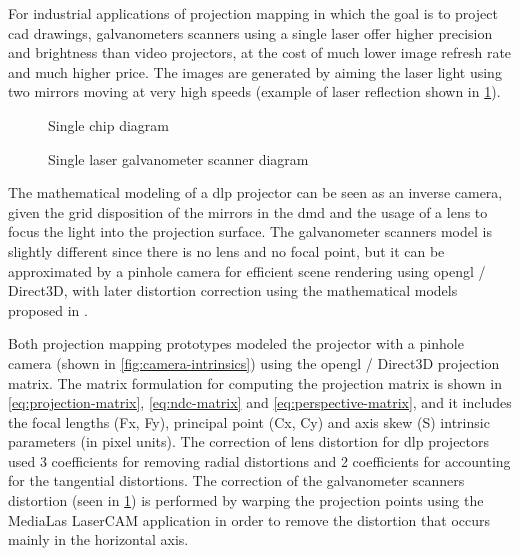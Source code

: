 For industrial applications of projection mapping in which the goal is to project \gls{cad} drawings, galvanometers scanners using a single laser offer higher precision and brightness than video projectors, at the cost of much lower image refresh rate and much higher price. The images are generated by aiming the laser light using two mirrors moving at very high speeds (example of laser reflection shown in \cref{fig:laser-projector-diagram-1-colors}).


\begin{figure}[H]
	\begin{floatrow}[2]
		{\caption{Single chip  diagram\protect\footnotemark}\label{fig:dlp-projector-diagram-1-dmd}}
		{\caption{Single laser galvanometer scanner diagram\protect\footnotemark}\label{fig:laser-projector-diagram-1-colors}}
	\end{floatrow}
\end{figure}


The mathematical modeling of a \gls{dlp} projector can be seen as an inverse camera, given the grid disposition of the mirrors in the \gls{dmd} and the usage of a lens to focus the light into the projection surface. The galvanometer scanners model is slightly different since there is no lens and no focal point, but it can be approximated by a pinhole camera for efficient scene rendering using \gls{opengl} / Direct3D, with later distortion correction using the mathematical models proposed in \cite{Manakov2011}.

Both projection mapping prototypes modeled the projector with a pinhole camera \cite{Hartley2003} (shown in \cref{fig:camera-intrinsics}) using the \gls{opengl} / Direct3D projection matrix. The matrix formulation for computing the projection matrix is shown in \cref{eq:projection-matrix}, \cref{eq:ndc-matrix} and \cref{eq:perspective-matrix}, and it includes the focal lengths (Fx, Fy), principal point (Cx, Cy) and axis skew (S) intrinsic parameters (in pixel units). The correction of lens distortion for \gls{dlp} projectors used 3 coefficients for removing radial distortions and 2 coefficients for accounting for the tangential distortions. The correction of the galvanometer scanners distortion (seen in \cref{fig:laser-projector-diagram-1-colors}) is performed by warping the projection points using the MediaLas LaserCAM application in order to remove the distortion that occurs mainly in the horizontal axis.


